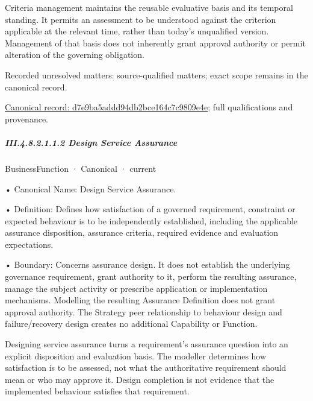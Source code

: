 Criteria management maintains the reusable evaluative basis and its temporal standing. It permits an assessment to be understood against the criterion applicable at the relevant time, rather than today's unqualified version. Management of that basis does not inherently grant approval authority or permit alteration of the governing obligation.


{\small Recorded unresolved matters: source-qualified matters; exact scope remains in the canonical record.}\par
{\footnotesize \href{../../../../../../../continuum/business/business-function/d7e9ba5addd94db2bce164c7c9809e4e.md}{Canonical record: d7e9ba5addd94db2bce164c7c9809e4e}; full qualifications and provenance.}\par
\subparagraph*{III.4.8.2.1.1.2 Design Service Assurance}
\label{navigation:III.4.8.2.1.1.2}

\label{element:6668aa8daf964fec93fce42d48b37ad1}
{\small BusinessFunction · Canonical · current}\par

•
Canonical Name: Design Service Assurance.



•
Definition: Defines how satisfaction of a governed requirement, constraint or expected behaviour is to be independently established, including the applicable assurance disposition, assurance criteria, required evidence and evaluation expectations.



•
Boundary: Concerns assurance design. It does not establish the underlying governance requirement, grant authority to it, perform the resulting assurance, manage the subject activity or prescribe application or implementation mechanisms. Modelling the resulting Assurance Definition does not grant approval authority. The Strategy peer relationship to behaviour design and failure/recovery design creates no additional Capability or Function.



Designing service assurance turns a requirement's assurance question into an explicit disposition and evaluation basis. The modeller determines how satisfaction is to be assessed, not what the authoritative requirement should mean or who may approve it. Design completion is not evidence that the implemented behaviour satisfies that requirement.


